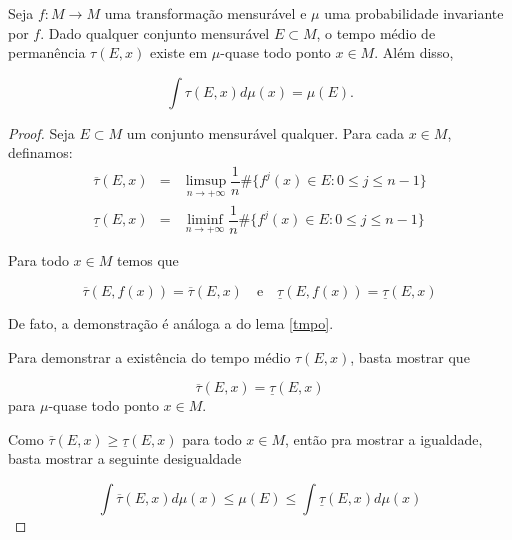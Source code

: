 \begin{teorema}\label{teb1}

Seja $f:M\to M$ uma transformação mensurável e $\mu$ uma probabilidade invariante por $f$. Dado qualquer conjunto mensurável $E\subset M$, o tempo médio de permanência $\tau(E,x)$ existe em $\mu$-quase todo ponto $x\in M$. Além disso, 

\begin{equation*}
\int\tau(E,x)d\mu(x)=\mu(E).
\end{equation*}\vspace{0.1cm}

\end{teorema}

\begin{proof}

Seja $E\subset M$ um conjunto mensurável qualquer. Para cada $x\in M$, definamos:
\begin{eqnarray*}
\overline{\tau}(E,x) & = & \limsup_{n\to+\infty}\dfrac{1}{n}\#\big\{f^j(x)\in E:0\leq j\leq n-1\big\}\\
\underline{\tau}(E,x) & = & \liminf_{n\to+\infty}\dfrac{1}{n}\#\big\{f^j(x)\in E:0\leq j\leq n-1\big\}
\end{eqnarray*}\vspace{0.1cm}

Para todo $x\in M$ temos que

\begin{equation}\label{L42}
\overline{\tau}(E,f(x))=\overline{\tau}(E,x)\quad\text{e}\quad\underline{\tau}(E,f(x))=\underline{\tau}(E,x)
\end{equation}\vspace{0.1cm}

De fato, a demonstração é análoga a do lema \ref{tmpo}.

Para demonstrar a existência do tempo médio $\tau(E,x)$, basta mostrar que

\begin{equation}
\overline{\tau}(E,x)=\underline{\tau}(E,x)
\end{equation}\vspace{0.1cm}
para $\mu$-quase todo ponto $x\in M$.

Como $\overline{\tau}(E,x)\geq\underline{\tau}(E,x)$ para todo $x\in M$, então pra mostrar a igualdade, basta mostrar a seguinte desigualdade

\begin{equation}\label{L44}
\int\overline{\tau}(E,x)d\mu(x)\leq\mu(E)\leq\int\underline{\tau}(E,x)d\mu(x)
\end{equation}\vspace{0.1cm}


\end{proof}
